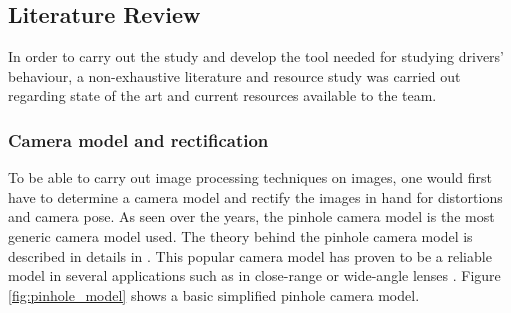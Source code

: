 \subsection{Literature Review}
In order to carry out the study and develop the tool needed for studying drivers' behaviour, a non-exhaustive literature and resource study was carried out regarding state of the art and current resources available to the team.






\subsubsection{Camera model and rectification}
To be able to carry out image processing techniques on images, one would first have to determine a camera model and rectify the images in hand for distortions and camera pose. As seen over the years, the pinhole camera model is the most generic camera model used. The theory behind the pinhole camera model is described in details in \cite{xu2013epipolar}. This popular camera model has proven to be a reliable model in several applications such as in close-range \cite{duane1971close} or wide-angle lenses \cite{swaminathan2000nonmetric}. Figure \ref{fig:pinhole_model} shows a basic simplified  pinhole camera model.

